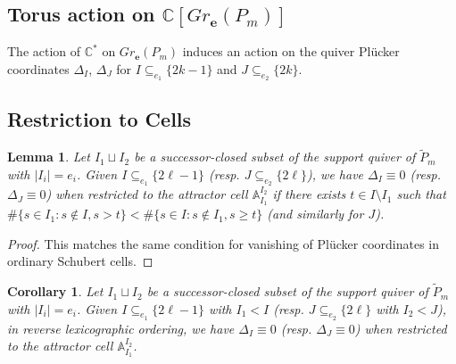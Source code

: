 \documentclass{amsart}
\newtheorem{corollary}[theorem]{Corollary}
\newtheorem{lemma}[theorem]{Lemma}
\numberwithin{equation}{section}
\renewcommand{\AA}{\mathbb{A}}
\newcommand{\CC}{\mathbb{C}}
\newcommand{\bfe}{\mathbf{e}}
\begin{document}
  \subsection{Torus action on $\CC[Gr_\bfe(P_m)]$}
  The action of $\CC^*$ on $Gr_\bfe(P_m)$ induces an action on the quiver Pl\"ucker coordinates $\Delta_I$, $\Delta_J$ for $I\subseteq_{e_1} \{2k-1\}$ and $J\subseteq_{e_2} \{2k\}$.


  \subsection{Restriction to Cells}

  \begin{lemma}
    Let $I_1\sqcup I_2$ be a successor-closed subset of the support quiver of $\tilde P_m$ with $|I_i|=e_i$.
    Given $I \subseteq_{e_1} \{2\ell-1\}$ (resp. $J \subseteq_{e_2} \{2\ell\}$), we have $\Delta_I\equiv 0$ (resp. $\Delta_J\equiv 0$) when restricted to the attractor cell $\AA_{I_1}^{I_2}$ if there exists $t\in I\setminus I_1$ such that $\#\{s\in I_1:s\notin I, s>t\} < \#\{s\in I:s\notin I_1, s \ge t\}$ (and similarly for $J$).
  \end{lemma}
  \begin{proof}
    This matches the same condition for vanishing of Pl\"ucker coordinates in ordinary Schubert cells.
  \end{proof}
  \begin{corollary}
    Let $I_1\sqcup I_2$ be a successor-closed subset of the support quiver of $\tilde P_m$ with $|I_i|=e_i$.
    Given $I \subseteq_{e_1} \{2\ell-1\}$ with $I_1<I$ (resp. $J \subseteq_{e_2} \{2\ell\}$ with $I_2<J$), in reverse lexicographic ordering, we have $\Delta_I \equiv 0$ (resp. $\Delta_J\equiv 0$) when restricted to the attractor cell $\AA_{I_1}^{I_2}$.
  \end{corollary}
\end{document}
